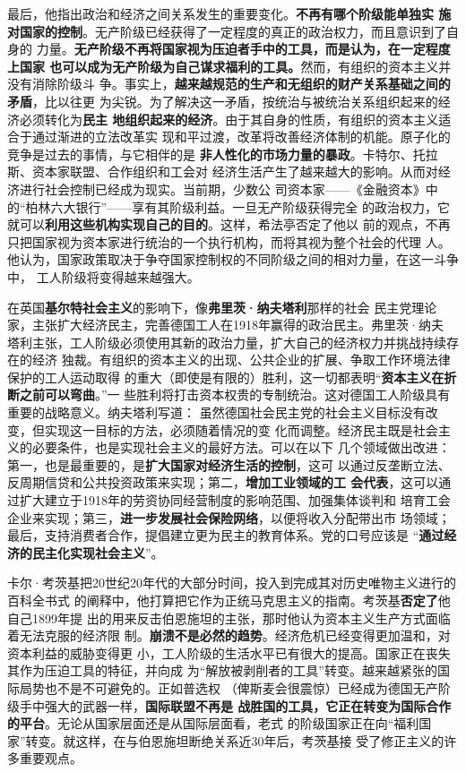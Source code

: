 最后，他指出政治和经济之间关系发生的重要变化。\textbf{不再有哪个阶级能单独实
施对国家的控制}。无产阶级已经获得了一定程度的真正的政治权力，而且意识到了自身的
力量。\textbf{无产阶级不再将国家视为压迫者手中的工具，而是认为，在一定程度上国家
也可以成为无产阶级为自己谋求福利的工具。}然而，有组织的资本主义并没有消除阶级斗
争。事实上，\textbf{越来越规范的生产和无组织的财产关系基础之间的矛盾}，比以往更
为尖锐。为了解决这一矛盾，按统治与被统治关系组织起来的经济必须转化为\textbf{民主
地组织起来的经济}。由于其自身的性质，有组织的资本主义适合于通过渐进的立法改革实
现和平过渡，改革将改善经济体制的机能。原子化的竞争是过去的事情，与它相伴的是
\textbf{非人性化的市场力量的暴政}。卡特尔、托拉斯、资本家联盟、合作组织和工会对
经济生活产生了越来越大的影响。从而对经济进行社会控制已经成为现实。当前期，少数公
司资本家——《金融资本》中的“柏林六大银行”——享有其阶级利益。一旦无产阶级获得完全
的政治权力，它就可以\textbf{利用这些机构实现自己的目的}。这样，希法亭否定了他以
前的观点，不再只把国家视为资本家进行统治的一个执行机构，而将其视为整个社会的代理
人。他认为，国家政策取决于争夺国家控制权的不同阶级之间的相对力量，在这一斗争中，
工人阶级将变得越来越强大。

在英国\textbf{基尔特社会主义}的影响下，像\textbf{弗里茨·纳夫塔利}那样的社会
民主党理论家，主张扩大经济民主，完善德国工人在1918年赢得的政治民主。弗里茨·纳夫
塔利主张，工人阶级必须使用其新的政治力量，扩大自己的经济权力并挑战持续存在的经济
独裁。有组织的资本主义的出现、公共企业的扩展、争取工作环境法律保护的工人运动取得
的重大（即使是有限的）胜利，这一切都表明“\textbf{资本主义在折断之前可以弯曲}。”一
些胜利将打击资本权贵的专制统治。这对德国工人阶级具有重要的战略意义。纳夫塔利写道：
虽然德国社会民主党的社会主义目标没有改变，但实现这一目标的方法，必须随着情况的变
化而调整。经济民主既是社会主义的必要条件，也是实现社会主义的最好方法。可以在以下
几个领域做出改进：第一，也是最重要的，是\textbf{扩大国家对经济生活的控制}，这可
以通过反垄断立法、反周期信贷和公共投资政策来实现；第二，\textbf{增加工业领域的工
会代表}，这可以通过扩大建立于1918年的劳资协同经营制度的影响范围、加强集体谈判和
培育工会企业来实现；第三，\textbf{进一步发展社会保险网络}，以便将收入分配带出市
场领域；最后，支持消费者合作，提倡建立更为民主的教育体系。党的口号应该是
“\textbf{通过经济的民主化实现社会主义}”。

卡尔·考茨基把20世纪20年代的大部分时间，投入到完成其对历史唯物主义进行的百科全书式
的阐释中，他打算把它作为正统马克思主义的指南。考茨基\textbf{否定了}他自己1899年提
出的用来反击伯恩施坦的主张，那时他认为资本主义生产方式面临着无法克服的经济限
制。\textbf{崩溃不是必然的趋势}。经济危机已经变得更加温和，对资本利益的威胁变得更
小，工人阶级的生活水平已有很大的提高。国家正在丧失其作为压迫工具的特征，并向成
为“解放被剥削者的工具”转变。越来越紧张的国际局势也不是不可避免的。正如普选权
（俾斯麦会很震惊）已经成为德国无产阶级手中强大的武器一样，\textbf{国际联盟不再是
  战胜国的工具，它正在转变为国际合作的平台}。无论从国家层面还是从国际层面看，老式
的阶级国家正在向“福利国家”转变。就这样，在与伯恩施坦断绝关系近30年后，考茨基接
受了修正主义的许多重要观点。

